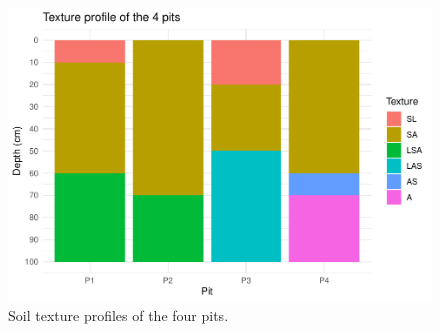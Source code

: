 \documentclass[fleqn,11pt]{latex/stylish_article} %
\begin{document}
\normalsize



\scriptsize

\begin{figure}

{\centering \includegraphics[width=0.8\linewidth]{pedoP16-report_files/figure-latex/pitPlotTextureProfile-1} 

}

\caption{Soil texture profiles of the four pits.}\label{fig:pitPlotTextureProfile}
\end{figure}

\normalsize



\makeatletter

\makeatother


\end{document}
